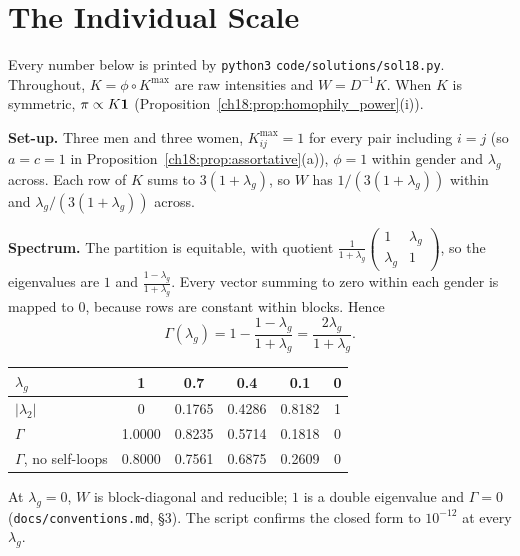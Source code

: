 \documentclass[../solutions_manual.tex]{subfiles}
\begin{document}
\begingroup\setlength{\emergencystretch}{3em}%
\ifSubfilesClassLoaded{\setcounter{chapter}{17}}{}%
\setcounter{chapter}{17}%
\chapter{The Individual Scale}\label{sol18}

Every number below is printed by \texttt{python3} \nolinkurl{code/solutions/sol18.py}. Throughout, $K = \phi\circ K^{\max}$ are raw intensities and $W = D^{-1}K$. When $K$ is symmetric, $\pi \propto K\mathbf{1}$ (Proposition~\ref{ch18:prop:homophily_power}(i)).


\textbf{Set-up.} Three men and three women, $K^{\max}_{ij} = 1$ for every pair including $i = j$ (so $a = c = 1$ in Proposition~\ref{ch18:prop:assortative}(a)), $\phi = 1$ within gender and $\lambda_g$ across. Each row of $K$ sums to $3(1 + \lambda_g)$, so $W$ has $1/(3(1+\lambda_g))$ within and $\lambda_g/(3(1+\lambda_g))$ across.

\textbf{Spectrum.} The partition is equitable, with quotient $\frac{1}{1+\lambda_g}\begin{pmatrix}1 & \lambda_g\\ \lambda_g & 1\end{pmatrix}$, so the eigenvalues are $1$ and $\frac{1-\lambda_g}{1+\lambda_g}$. Every vector summing to zero within each gender is mapped to $0$, because rows are constant within blocks. Hence
\[
\Gamma(\lambda_g) = 1 - \frac{1-\lambda_g}{1+\lambda_g} = \frac{2\lambda_g}{1+\lambda_g}.
\]
\begin{center}
\begin{tabular}{lccccc}
\toprule
$\lambda_g$ & 1 & 0.7 & 0.4 & 0.1 & 0 \\
\midrule
$|\lambda_2|$ & 0 & 0.1765 & 0.4286 & 0.8182 & 1 \\
$\Gamma$ & 1.0000 & 0.8235 & 0.5714 & 0.1818 & 0 \\
$\Gamma$, no self-loops & 0.8000 & 0.7561 & 0.6875 & 0.2609 & 0 \\
\bottomrule
\end{tabular}
\end{center}
At $\lambda_g = 0$, $W$ is block-diagonal and reducible; $1$ is a double eigenvalue and $\Gamma = 0$ (\nolinkurl{docs/conventions.md}, \S3). The script confirms the closed form to $10^{-12}$ at every $\lambda_g$.
\end{document}
